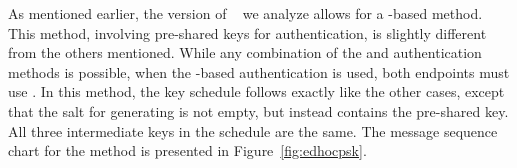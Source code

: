 \documentclass[runningheads, envcountsame, hidelinks, a4paper, draft, x11names]{llncs}
\begin{document}
As mentioned earlier, the version of
\mEdhoc{}~\cite{our-analysis-selander-lake-edhoc-01} we analyze allows for a
\mPsk{}-based method.
%
This method, involving pre-shared keys for authentication, is slightly different from the others mentioned.
%
While any combination of the \mSig{} and \mStat{} authentication methods is
possible, when the \mPsk{}-based authentication is used, both endpoints must
use \mPsk{}.
In this method, the key schedule follows exactly like the other cases, except that the
salt for generating \mPRKtwo{} is not empty, but instead contains the
pre-shared key.
%
All three intermediate keys in the schedule are the same.
%
The message sequence chart for the \mPsk{} method is presented in
Figure~\ref{fig:edhocpsk}. 

\end{document}
